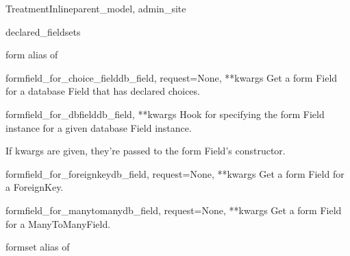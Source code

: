 \documentclass[letterpaper,10pt,english]{sphinxmanual}
\begin{document}
\hypertarget{data.admin.TreatmentInline}{}\begin{classdesc}{TreatmentInline}{parent\_model, admin\_site}~

\hypertarget{data.admin.TreatmentInline.declared_fieldsets}{}\begin{memberdesc}{declared\_fieldsets}\end{memberdesc}

\hypertarget{data.admin.TreatmentInline.form}{}\begin{memberdesc}{form}
alias of 
\end{memberdesc}

\hypertarget{data.admin.TreatmentInline.formfield_for_choice_field}{}\begin{methoddesc}{formfield\_for\_choice\_field}{db\_field, request=None, **kwargs}
Get a form Field for a database Field that has declared choices.
\end{methoddesc}

\hypertarget{data.admin.TreatmentInline.formfield_for_dbfield}{}\begin{methoddesc}{formfield\_for\_dbfield}{db\_field, **kwargs}
Hook for specifying the form Field instance for a given database Field
instance.

If kwargs are given, they're passed to the form Field's constructor.
\end{methoddesc}

\hypertarget{data.admin.TreatmentInline.formfield_for_foreignkey}{}\begin{methoddesc}{formfield\_for\_foreignkey}{db\_field, request=None, **kwargs}
Get a form Field for a ForeignKey.
\end{methoddesc}

\hypertarget{data.admin.TreatmentInline.formfield_for_manytomany}{}\begin{methoddesc}{formfield\_for\_manytomany}{db\_field, request=None, **kwargs}
Get a form Field for a ManyToManyField.
\end{methoddesc}

\hypertarget{data.admin.TreatmentInline.formset}{}\begin{memberdesc}{formset}
alias of 
\end{memberdesc}


\end{classdesc}
\end{document}
